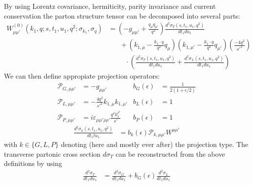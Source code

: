 By using Lorentz covariance, hermiticity, parity invariance and current conservation the parton structure tensor can be decomposed into several parts:
\begin{align}
W_{\mu\mu'}^{(0)}(k_1,q;s,t_1,u_1,q^2;\sigma_{k_1},\sigma_{q}) &= \left(-g_{\mu\mu'} + \frac{q_\mu q_{\mu'}}{q^2}\right)\frac{d^2\sigma_T(s,t_1,u_1,q^2)}{dt_1du_1} \nonumber\\
 &\hspace{20pt} +\left(k_{1,\mu}-\frac{k_1\cdot q}{q^2}q_\mu\right)\left(k_{1,\mu'}-\frac{k_1\cdot q}{q^2}q_{\mu'}\right)\left(\frac{-4q^2}{{s'}^2}\right) \nonumber\\
 &\hspace{30pt} \cdot\left(\frac{d^2\sigma_T(s,t_1,u_1,q^2)}{dt_1du_1}+\frac{d^2\sigma_L(s,t_1,u_1,q^2)}{dt_1du_1}\right)
\end{align}
We can then define appropiate projection operators\cite{Vogelsang:1993eg}:
\begin{align}
\mathcal P_{G,\mu\mu'} &= -g_{\mu\mu'} &b_G(\epsilon) &= \frac 1 {2(1+\epsilon/2)}\\
\mathcal P_{L,\mu\mu'} &= -\frac{4q^2}{{s'}^2} k_{1,\mu}k_{1,\mu'} &b_L(\epsilon) &= 1\\
\mathcal P_{P,\mu\mu'} &= i\varepsilon_{\mu\mu'\rho\rho'}\frac{q^{\rho}k_1^{\rho'}}{s'} &b_P(\epsilon) &= 1
\end{align}
\begin{align}
\frac{d^2\sigma_{k}(s,t_1,u_1,q^2)}{dt_1tu_1} &= b_k(\epsilon)\mathcal P_{k,\mu\mu'}W^{\mu\mu'}
\end{align}
with $k\in\{G,L,P\}$ denoting (here and mostly ever after) the projection type. The transverse partonic cross section $d\sigma_T$ can be reconstructed from the above definitions by using
\begin{align}
\frac{d^2\sigma_T}{dt_1du_1} &= \frac{d^2\sigma_G}{dt_1du_1} + b_G(\epsilon)\frac{d^2\sigma_L}{dt_1du_1}
\end{align}


